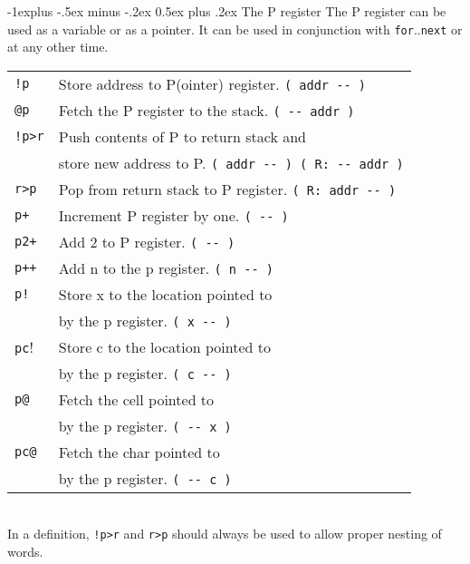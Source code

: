 \documentclass[10pt,landscape,a4paper]{article}
\makeatletter
\renewcommand{\subsection}{\@startsection{subsection}{2}{0mm}%
                                {-1explus -.5ex minus -.2ex}%
                                {0.5ex plus .2ex}%
                                {\normalfont\normalsize\bfseries}}
\newcommand{\compileonly}{\color{blue}}
\makeatother
\begin{document}
\begin{multicols}{3}
\subsection{The P register}
The P register can be used as a variable or as a pointer. 
It can be used in conjunction with \verb!for!..\verb!next! 
or at any other time.\\
\begin{tabular}{@{}ll@{}}
\verb?!p?  & Store address to P(ointer) register. \verb!( addr -- )! \\
\verb!@p!  & Fetch the P register to the stack. \verb!( -- addr )! \\
{\compileonly\verb?!p>r?}  & Push contents of P to return stack and \\
             & store new address to P. \verb!( addr -- ) ( R: -- addr )! \\
{\compileonly\verb!r>p!}  & Pop from return stack to P register. \verb!( R: addr -- )! \\ 
\verb!p+! & Increment P register by one. \verb!( -- )! \\
\verb!p2+!  & Add 2 to P register. \verb!( -- )! \\
\verb!p++!  & Add n to the p register. \verb!( n -- )! \\
\verb?p!?  & Store x to the location pointed to \\
           & by the p register. \verb!( x -- )! \\
\verb!pc!!  & Store c to the location pointed to \\
            & by the p register. \verb!( c -- )! \\
\verb!p@!  & Fetch the cell pointed to \\
           & by the p register. \verb!( -- x )! \\
\verb!pc@!  & Fetch the char pointed to \\ 
            & by the p register. \verb!( -- c )! \\
\end{tabular}\\
In a definition, \verb?!p>r? and \verb!r>p! should always be used 
to allow proper nesting of words.

\bigskip


\end{multicols}
\end{document}
